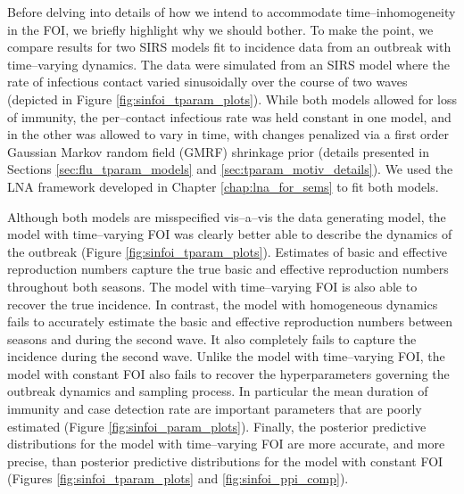 Before delving into details of how we intend to accommodate time--inhomogeneity in the FOI, we briefly highlight why we should bother. To make the point, we compare results for two SIRS models fit to incidence data from an outbreak with time--varying dynamics. The data were simulated from an SIRS model where the rate of infectious contact varied sinusoidally over the course of two waves (depicted in Figure \ref{fig:sinfoi_tparam_plots}). While both models allowed for loss of immunity, the per--contact infectious rate was held constant in one model, and in the other was allowed to vary in time, with changes penalized via a first order Gaussian Markov random field (GMRF) shrinkage prior (details presented in Sections \ref{sec:flu_tparam_models} and \ref{sec:tparam_motiv_details}). We used the LNA framework developed in Chapter \ref{chap:lna_for_sems} to fit both models. 

Although both models are misspecified vis--a--vis the  data generating model, the model with time--varying FOI was clearly better able to describe the dynamics of the outbreak (Figure \ref{fig:sinfoi_tparam_plots}). Estimates of basic and effective reproduction numbers capture the true basic and effective reproduction numbers throughout both seasons. The model with time--varying FOI is also able to recover the true incidence. In contrast, the model with homogeneous dynamics fails to accurately estimate the basic and effective reproduction numbers between seasons and during the second wave. It also completely fails to capture the incidence during the second wave. Unlike the model with time--varying FOI, the model with constant FOI also fails to recover the hyperparameters governing the outbreak dynamics and sampling process. In particular the mean duration of immunity and case detection rate are important parameters that are poorly estimated (Figure \ref{fig:sinfoi_param_plots}). Finally, the posterior predictive distributions for the model with time--varying FOI are more accurate, and more precise, than posterior predictive distributions for the model with constant FOI (Figures \ref{fig:sinfoi_tparam_plots} and \ref{fig:sinfoi_ppi_comp}).

